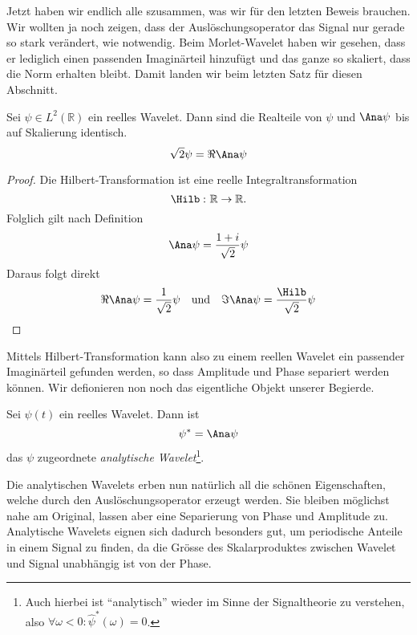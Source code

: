 Jetzt haben wir endlich alle szusammen, was wir für den letzten Beweis brauchen.
Wir wollten ja noch zeigen, dass der Auslöschungsoperator das Signal nur gerade so stark verändert, wie notwendig.
Beim Morlet-Wavelet haben wir gesehen, dass er lediglich einen passenden Imaginärteil hinzufügt und das ganze so skaliert, dass die Norm erhalten bleibt.
Damit landen wir beim letzten Satz für diesen Abschnitt.

\begin{satz}
	Sei $\psi \in L^2(\mathbb R)$ ein reelles Wavelet. Dann sind die Realteile von $\psi$ und $\Ana\psi$ bis auf Skalierung identisch.
	\[ \sqrt 2 \psi = \Re\Ana\psi\]
\end{satz}

\begin{proof}
	Die Hilbert-Transformation ist eine reelle Integraltransformation
	\[\Hilb\,\colon\mathbb{R}\to\mathbb{R}.\]
	Folglich gilt nach Definition
	\[\Ana\psi = \frac{1 + i}{\sqrt 2}\psi\]
	Daraus folgt direkt
	\[\Re \Ana\psi = \frac{1}{\sqrt 2}\psi \quad \text{und}\quad \Im \Ana\psi = \frac{\Hilb }{\sqrt 2}\psi\qedhere\]
\end{proof}

Mittels Hilbert-Transformation kann also zu einem reellen Wavelet ein passender Imaginärteil gefunden werden, so dass Amplitude und Phase separiert werden können.
Wir defionieren non noch das eigentliche Objekt unserer Begierde.

\begin{satz}
	\label{complex:analytic-wavelet}
	Sei $\psi(t)$ ein reelles Wavelet. Dann ist
	\begin{equation}
	\psi^\ast = \Ana\psi
	\end{equation}
	das $\psi$ zugeordnete \emph{analytische Wavelet}\footnote{Auch hierbei ist ``analytisch'' wieder im Sinne der Signaltheorie zu verstehen, also $\forall \omega < 0 \colon \hat\psi^\ast(\omega) = 0$.}.
\end{satz}

Die analytischen Wavelets erben nun natürlich all die schönen Eigenschaften, welche durch den Auslöschungsoperator erzeugt werden.
Sie bleiben möglichst nahe am Original, lassen aber eine Separierung von Phase und Amplitude zu.
Analytische Wavelets eignen sich dadurch besonders gut, um periodische Anteile in einem Signal zu finden, da die Grösse des Skalarproduktes zwischen Wavelet und Signal unabhängig ist von der Phase.
